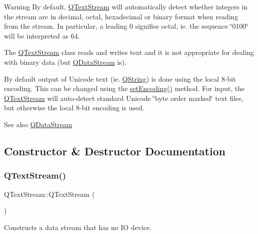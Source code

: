 \begin{DoxyWarning}{Warning}
By default, \mbox{\hyperlink{class_q_text_stream}{Q\+Text\+Stream}} will automatically detect whether integers in the stream are in decimal, octal, hexadecimal or binary format when reading from the stream. In particular, a leading \textquotesingle{}0\textquotesingle{} signifies octal, ie. the sequence \char`\"{}0100\char`\"{} will be interpreted as 64.
\end{DoxyWarning}
The \mbox{\hyperlink{class_q_text_stream}{Q\+Text\+Stream}} class reads and writes text and it is not appropriate for dealing with binary data (but \mbox{\hyperlink{class_q_data_stream}{Q\+Data\+Stream}} is).

By default output of Unicode text (ie. \mbox{\hyperlink{class_q_string}{Q\+String}}) is done using the local 8-\/bit encoding. This can be changed using the \mbox{\hyperlink{class_q_text_stream_ad06dc1f99476aed01fa8a822e871dc44}{set\+Encoding()}} method. For input, the \mbox{\hyperlink{class_q_text_stream}{Q\+Text\+Stream}} will auto-\/detect standard Unicode \char`\"{}byte order marked\char`\"{} text files, but otherwise the local 8-\/bit encoding is used.

\begin{DoxySeeAlso}{See also}
\mbox{\hyperlink{class_q_data_stream}{Q\+Data\+Stream}} 
\end{DoxySeeAlso}


\subsection{Constructor \& Destructor Documentation}
\mbox{\label{class_q_text_stream_aa7bbd71ba288daceba843f54f0c306a4}} 
\subsubsection{\texorpdfstring{QTextStream()}{QTextStream()}\hspace{0.1cm}{\footnotesize\ttfamily [1/6]}}
{\footnotesize\ttfamily Q\+Text\+Stream\+::\+Q\+Text\+Stream (\begin{DoxyParamCaption}{ }\end{DoxyParamCaption})}

Constructs a data stream that has no IO device. \mbox{\label{class_q_text_stream_a431c964c498560a2459d55808ccaff89}} 
